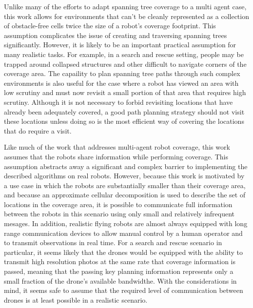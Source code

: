 Unlike many of the efforts to adapt spanning tree coverage to a multi agent case, this work allows for environments that can't be cleanly represented as a collection of obstacle-free cells twice the size of a robot's coverage footprint. This assumption complicates the issue of creating and traversing spanning trees significantly. However, it is likely to be an important practical assumption for many realistic tasks. For example, in a search and rescue setting, people may be trapped around collapsed structures and other difficult to navigate corners of the coverage area. The capaility to plan spanning tree paths through such complex environments is also useful for the case where a robot has viewed an area with low scrutiny and must now revisit a small portion of that area that requires high scrutiny. Although it is not necessary to forbid revisiting locations that have already been adequately covered, a good path planning strategy should not visit these locations unless doing so is the most efficient way of covering the locations that do require a visit.

Like much of the work that addresses multi-agent robot coverage, this work assumes that the robots share information while performing coverage. This assumption abstracts away a significant and complex barrier to implementing the described algorithms on real robots. However, because this work is motivated by a use case in which the robots are substantially smaller than their coverage area, and because an approximate cellular decomposition is used to describe the set of locations in the coverage area, it is possible to communicate full information between the robots in this scenario using only small and relatively infrequent mesages. In addition, realistic flying robots are almost always equipped with long range communication devices to allow manual control by a human operator and to transmit observations in real time. For a search and rescue scenario in particular, it seems likely that the drones would be equipped with the ability to transmit high resolution photos at the same rate that coverage information is passed, meaning that the passing key planning information represents only a small fraction of the drone's available bandwidthe. With the considerations in mind, it seems safe to assume that the required level of communication between drones is at least possible in a realistic scenario. 

